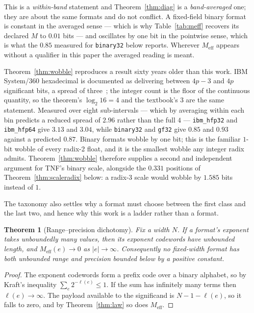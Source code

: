 \documentclass[11pt]{article}
\newtheorem{theorem}{Theorem}
\theoremstyle{definition}
\begin{document}
This is a \emph{within-band} statement and Theorem~\ref{thm:diag} is a
\emph{band-averaged} one; they are about the same formats and do not conflict.
A fixed-field binary format is constant in the averaged sense --- which is why
Table~\ref{tab:meff} recovers its declared $M$ to $0.01$ bits --- and oscillates by
one bit in the pointwise sense, which is what the $0.85$ measured for
\texttt{binary32} below reports. Wherever $M_{\mathrm{eff}}$ appears without a
qualifier in this paper the averaged reading is meant.

Theorem~\ref{thm:wobble} reproduces a result sixty years older than this work.
IBM System/360 hexadecimal is documented as delivering between $4p-3$ and $4p$
significant bits, a spread of three~\cite{goldberg1991,ibmhfp}; the integer count
is the floor of the continuous quantity, so the theorem's $\log_2 16 = 4$ and the
textbook's $3$ are the same statement. Measured over eight sub-intervals ---
which by averaging within each bin predicts a reduced spread of $2.96$ rather than
the full $4$ --- \texttt{ibm\_hfp32} and \texttt{ibm\_hfp64} give $3.13$ and
$3.04$, while \texttt{binary32} and \texttt{gf32} give $0.85$ and $0.93$ against a
predicted $0.87$. Binary formats wobble by one bit; this is the familiar
$1$-bit wobble of every radix-2 float, and it is the smallest wobble any integer
radix admits. Theorem~\ref{thm:wobble} therefore supplies a second and independent
argument for TNF's binary scale, alongside the $0.331$ positions of
Theorem~\ref{thm:scaleradix} below: a radix-3 scale would wobble by $1.585$ bits
instead of $1$.

The taxonomy also settles why a format must choose between the first class and the
last two, and hence why this work is a ladder rather than a format.

\begin{theorem}[Range--precision dichotomy]
\label{thm:dichotomy}
Fix a width $N$. If a format's exponent takes unboundedly many values, then its
exponent codewords have unbounded length, and
$M_{\mathrm{eff}}(e)\to0$ as $|e|\to\infty$. Consequently no fixed-width format
has both unbounded range and precision bounded below by a positive constant.
\end{theorem}

\begin{proof}
The exponent codewords form a prefix code over a binary alphabet, so by Kraft's
inequality $\sum_{e} 2^{-\ell(e)} \leq 1$. If the sum has infinitely many terms
then $\ell(e) \to \infty$. The payload available to the significand is
$N - 1 - \ell(e)$, so it falls to zero, and by Theorem~\ref{thm:law} so does
$M_{\mathrm{eff}}$.
\end{proof}
\end{document}
